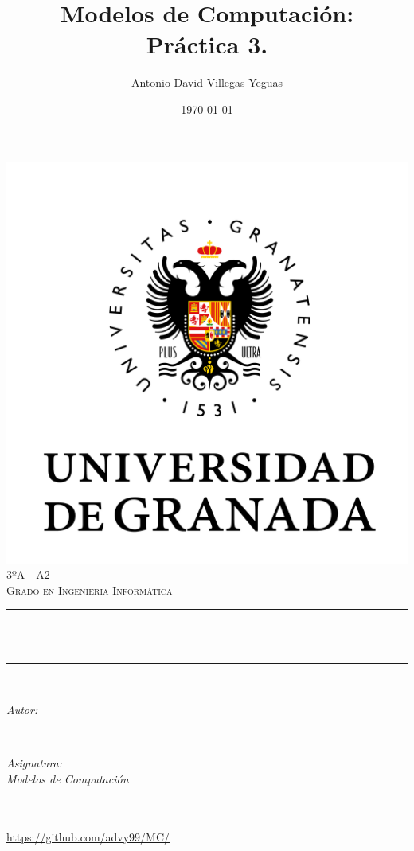 \documentclass[12pt, spanish]{article}
\title{Modelos de Computación:\\
Práctica 3. \hspace{0.05cm} }
\author{Antonio David Villegas Yeguas}
\date{\today}
\makeatletter
\let\thetitle\@title
\let\theauthor\@author
\let\thedate\@date
\makeatother
\begin{document}

\begin{titlepage}
    \centering
    \vspace*{0.5 cm}
    \includegraphics[scale = 0.50]{ugr.png}\\[1.0 cm]
    \textsc{\large 3ºA - A2}\\[0.5 cm]            
    \textsc{\large Grado en Ingeniería Informática}\\[0.5 cm]              
    \rule{\linewidth}{0.2 mm} \\[0.2 cm]
    { \huge \bfseries \thetitle}\\
    \rule{\linewidth}{0.2 mm} \\[1 cm]
    
    \begin{minipage}{0.4\textwidth}
        \begin{flushleft} \large
            \emph{Autor:}\\
            \theauthor
            \end{flushleft}
            \end{minipage}~
            \begin{minipage}{0.4\textwidth}
            \begin{flushright} \large
            \emph{Asignatura: \\
            Modelos de Computación}                   
        \end{flushright}
    \end{minipage}\\[0.5cm]
  
    {\large \thedate}\\[0.5cm]
    {\url{https://github.com/advy99/MC/}}
    {\doclicenseThis}
 	
    \vfill
    
\end{titlepage}
\end{document}
